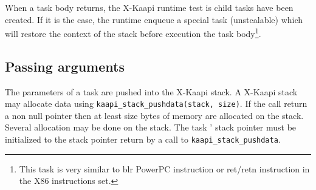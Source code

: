 \documentclass[12pt]{report}
\newcommand{\kaapi}{\textsc{X}-Kaapi\xspace}
\begin{document}
When a task body returns, the \kaapi runtime test is child tasks have been created.
If it is the case, the runtime enqueue a special task (unstealable) which will restore the
context of the stack before execution the task body\footnote{This task is very similar to blr PowerPC instruction or ret/retn instruction in the X86 instructions set.}.


\subsection{Passing arguments} \label{sec:param}

The parameters of a task are pushed into the \kaapi stack.
A \kaapi stack may allocate data using \verb+kaapi_stack_pushdata(stack, size)+. If the call return a non null pointer then at least size bytes of memory are allocated on the stack. Several allocation may be done on the stack. 
The task ' stack pointer must be initialized to the stack pointer return by a call to \verb+kaapi_stack_pushdata+.


\end{document}
